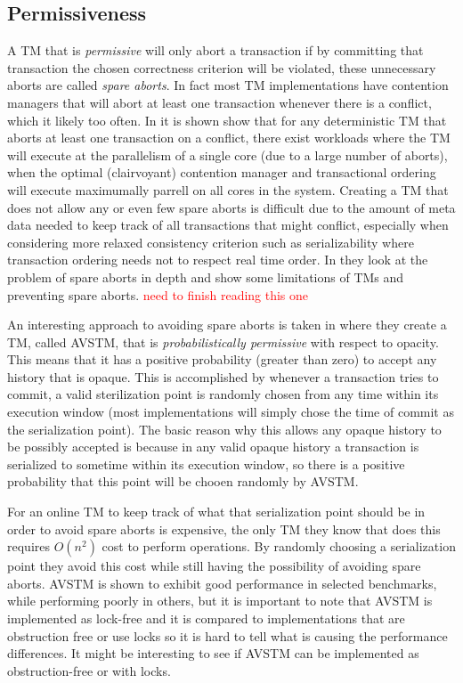 \subsection{Permissiveness}
A TM that is \emph{permissive} \cite{LPD-CONF-2008-031} will only abort a transaction if by committing that transaction the chosen correctness criterion will be violated, these unnecessary aborts are called \emph{spare aborts}.
In fact most TM implementations have contention managers that will abort at least one transaction whenever there is a conflict, which it likely too often.
In \cite{1696831} it is shown show that for any deterministic TM that aborts at least one transaction on a conflict, there exist workloads where the TM will execute at the parallelism of a single core (due to a large number of aborts), when the optimal (clairvoyant) contention manager and transactional ordering will execute maximumally parrell on all cores in the system.
Creating a TM that does not allow any or even few spare aborts is difficult due to the amount of meta data needed to keep track of all transactions that might conflict, especially when considering more relaxed consistency criterion such as serializability where transaction ordering needs not to respect real time order.
In \cite{1584013} they look at the problem of spare aborts in depth and show some limitations of TMs and preventing spare aborts.
\textcolor{Red}{need to finish reading this one}

An interesting approach to avoiding spare aborts is taken in \cite{LPD-CONF-2008-031} where they create a TM, called AVSTM, that is \emph{probabilistically permissive} with respect to opacity.
This means that it has a positive probability (greater than zero) to accept any history that is opaque.
This is accomplished by whenever a transaction tries to commit, a valid sterilization point is randomly chosen from any time within its execution window (most implementations will simply chose the time of commit as the serialization point).
The basic reason why this allows any opaque history to be possibly accepted is because in any valid opaque history a transaction is serialized to sometime within its execution window, so there is a positive probability that this point will be chooen randomly by AVSTM.

For an online TM to keep track of what that serialization point should be in order to avoid spare aborts is expensive, the only TM they know that does this requires $O(n^2)$ cost to perform operations.
By randomly choosing a serialization point they avoid this cost while still having the possibility of avoiding spare aborts.
AVSTM is shown to exhibit good performance in selected benchmarks, while performing poorly in others, but it is important to note that AVSTM is implemented as lock-free and it is compared to implementations that are obstruction free or use locks so it is hard to tell what is causing the performance differences.
It might be interesting to see if AVSTM can be implemented as obstruction-free or with locks.

